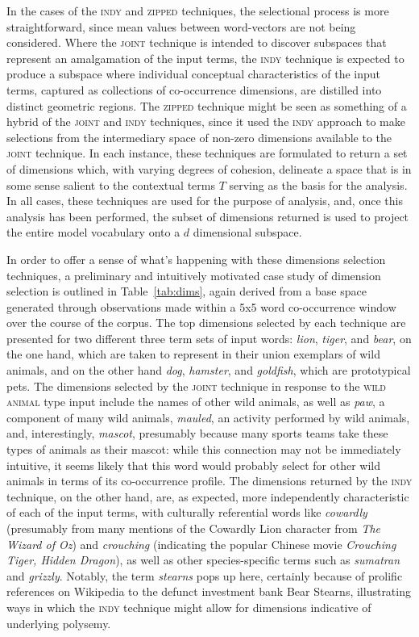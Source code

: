 In the cases of the \textsc{indy} and \textsc{zipped} techniques, the selectional process is more straightforward, since mean values between word-vectors are not being considered.  Where the \textsc{joint} technique is intended to discover subspaces that represent an amalgamation of the input terms, the \textsc{indy} technique is expected to produce a subspace where individual conceptual characteristics of the input terms, captured as collections of co-occurrence dimensions, are distilled into distinct geometric regions.  The \textsc{zipped} technique might be seen as something of a hybrid of the \textsc{joint} and \textsc{indy} techniques, since it used the \textsc{indy} approach to make selections from the intermediary space of non-zero dimensions available to the \textsc{joint} technique.  In each instance, these techniques are formulated to return a set of dimensions which, with varying degrees of cohesion, delineate a space that is in some sense salient to the contextual terms $T$ serving as the basis for the analysis.  In all cases, these techniques are used for the purpose of analysis, and, once this analysis has been performed, the subset of dimensions returned is used to project the entire model vocabulary onto a $d$ dimensional subspace.

In order to offer a sense of what's happening with these dimensions selection techniques, a preliminary and intuitively motivated case study of dimension selection is outlined in Table~\ref{tab:dims}, again derived from a base space generated through observations made within a 5x5 word co-occurrence window over the course of the corpus.  The top dimensions selected by each technique are presented for two different three term sets of input words: \emph{lion}, \emph{tiger}, and \emph{bear}, on the one hand, which are taken to represent in their union exemplars of wild animals, and on the other hand \emph{dog}, \emph{hamster}, and \emph{goldfish}, which are prototypical pets.  The dimensions selected by the \textsc{joint} technique in response to the \textsc{wild animal} type input include the names of other wild animals, as well as \emph{paw}, a component of many wild animals, \emph{mauled}, an activity performed by wild animals, and, interestingly, \emph{mascot}, presumably because many sports teams take these types of animals as their mascot: while this connection may not be immediately intuitive, it seems likely that this word would probably select for other wild animals in terms of its co-occurrence profile.  The dimensions returned by the \textsc{indy} technique, on the other hand, are, as expected, more independently characteristic of each of the input terms, with culturally referential words like \emph{cowardly} (presumably from many mentions of the Cowardly Lion character from \emph{The Wizard of Oz}) and \emph{crouching} (indicating the popular Chinese movie \emph{Crouching Tiger, Hidden Dragon}), as well as other species-specific terms such as \emph{sumatran} and \emph{grizzly}.  Notably, the term \emph{stearns} pops up here, certainly because of prolific references on Wikipedia to the defunct investment bank Bear Stearns, illustrating ways in which the \textsc{indy} technique might allow for dimensions indicative of underlying polysemy.

